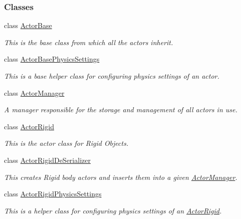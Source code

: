 \subsubsection*{Classes}
\begin{DoxyCompactItemize}
\item 
class \hyperlink{classMezzanine_1_1ActorBase}{Actor\-Base}
\begin{DoxyCompactList}\small\item\em This is the base class from which all the actors inherit. \end{DoxyCompactList}\item 
class \hyperlink{classMezzanine_1_1ActorBasePhysicsSettings}{Actor\-Base\-Physics\-Settings}
\begin{DoxyCompactList}\small\item\em This is a base helper class for configuring physics settings of an actor. \end{DoxyCompactList}\item 
class \hyperlink{classMezzanine_1_1ActorManager}{Actor\-Manager}
\begin{DoxyCompactList}\small\item\em A manager responsible for the storage and management of all actors in use. \end{DoxyCompactList}\item 
class \hyperlink{classMezzanine_1_1ActorRigid}{Actor\-Rigid}
\begin{DoxyCompactList}\small\item\em This is the actor class for Rigid Objects. \end{DoxyCompactList}\item 
class \hyperlink{classMezzanine_1_1ActorRigidDeSerializer}{Actor\-Rigid\-De\-Serializer}
\begin{DoxyCompactList}\small\item\em This creates Rigid body actors and inserts them into a given \hyperlink{classMezzanine_1_1ActorManager}{Actor\-Manager}. \end{DoxyCompactList}\item 
class \hyperlink{classMezzanine_1_1ActorRigidPhysicsSettings}{Actor\-Rigid\-Physics\-Settings}
\begin{DoxyCompactList}\small\item\em This is a helper class for configuring physics settings of an \hyperlink{classMezzanine_1_1ActorRigid}{Actor\-Rigid}. \end{DoxyCompactList}\item 

\end{DoxyCompactItemize}

